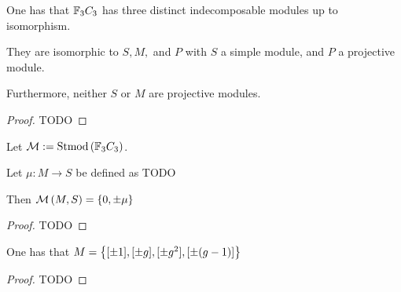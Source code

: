 \begin{lemma}
    One has that \( {\mathbb{F}}_3 C_3 \) has three distinct indecomposable modules up to isomorphism.
    
    They are isomorphic to \( S, M, \) and \( P \) with \( S \) a simple module, and \( P \) a projective module.

    Furthermore, neither \( S \) or \( M \) are projective modules.
\end{lemma}
\begin{proof}
    TODO
\end{proof}

\begin{definition}
    Let \( {\mathcal{M}} := \operatorname{Stmod}\left(  {\mathbb{F}}_3C_3  \right) \).
\end{definition}

\begin{lemma} \label{thm:f_3c_3_mu}
    Let \( \mu: M \to S \) be defined as TODO

    Then \( {\mathcal{M}}\left( M, S \right) = \left\{ 0, \pm\mu \right\} \)
\end{lemma}
\begin{proof}
    TODO
\end{proof}

\begin{lemma} \label{lem:classify_m}
    One has that \( M = \left\{ [\pm 1], [\pm g], [\pm g^2], [\pm (g - 1)] \right\} \)
\end{lemma}
\begin{proof}
    TODO
\end{proof}

